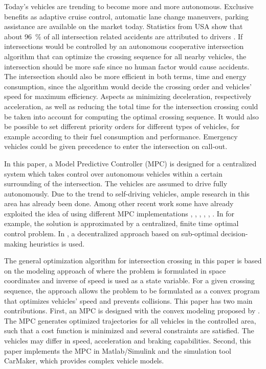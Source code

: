 \documentclass[letterpaper,10pt,conference]{ieeeconf}
\begin{document}
Today's vehicles are trending to become more and more autonomous. Exclusive benefits as adaptive cruise control, automatic lane change maneuvers, parking assistance are available on the market today. Statistics from USA show that about \SI{96}{\%} of all intersection related accidents are attributed to drivers \cite{nhtsa}. If intersections would be controlled by an autonomous cooperative intersection algorithm that can optimize the crossing sequence for all nearby vehicles, the intersection should be more safe since no human factor would cause accidents. The intersection should also be more efficient in both terms, time and energy consumption, since the algorithm would decide the crossing order and vehicles' speed for maximum efficiency. Aspects as minimizing deceleration, respectively acceleration, as well as reducing the total time for the intersection crossing could be taken into account for computing the optimal crossing sequence. It would also be possible to set different priority orders for different types of vehicles, for example according to their fuel consumption and performance. Emergency vehicles could be given precedence to enter the intersection on call-out.

In this paper, a Model Predictive Controller (MPC) is designed for a centralized system which takes control over autonomous vehicles within a certain surrounding of the intersection. The vehicles are assumed to drive fully autonomously. Due to the trend to self-driving vehicles, ample research in this area has already been done. Among other recent work some have already exploited the idea of using different MPC implementations \cite{eleven}, \cite{twelve}, \cite{thirteen}, \cite{fourteen}, \cite{fifteen}, \cite{nikolce}. In \cite{thirteen} for example, the solution is approximated by a centralized, finite time optimal control problem. In \cite{fourteen}, a decentralized approach based on sub-optimal decision-making heuristics is used.

The general optimization algorithm for intersection crossing in this paper is based on the modeling approach of \cite{nikolce} where the problem is formulated in space coordinates and inverse of speed is used as a state variable. For a given crossing sequence, the approach allows the problem to be formulated as a convex program that optimizes vehicles' speed and prevents collisions. This paper has two main contributions. First, an MPC is designed with the convex modeling proposed by \cite{nikolce}. The MPC generates optimized trajectories for all vehicles in the controlled area, such that a cost function is minimized and several constraints are satisfied. The vehicles may differ in speed, acceleration and braking capabilities. Second, this paper implements the MPC in Matlab/Simulink and the simulation tool CarMaker, which provides complex vehicle models.
\end{document}
